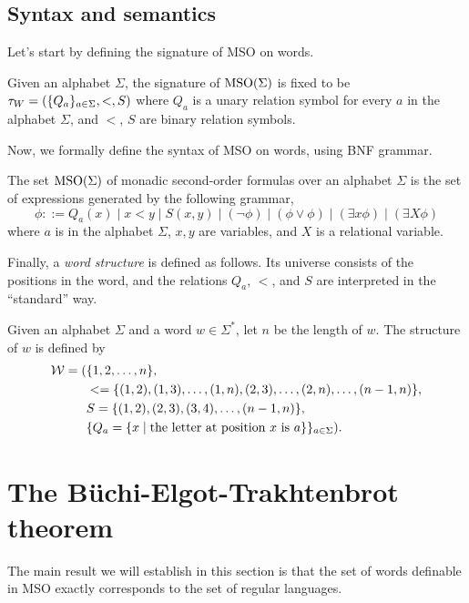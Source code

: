 \documentclass[11pt,twoside=off,numbers=noenddot]{scrbook}
\begin{document}
\subsection{Syntax and semantics}
Let's start by defining the signature of MSO on words.

\begin{definition}
  Given an alphabet $\Sigma$, the signature of $\text{MSO}(\Sigma)$ is fixed to be $\tau_W = (\{ Q_a \}_{a \in \Sigma}, <, S)$ where $Q_a$ is a unary relation symbol for every $a$ in the alphabet $\Sigma$, and $<$, $S$ are binary relation symbols.
\end{definition}

Now, we formally define the syntax of MSO on words, using BNF grammar.

\begin{definition}
  The set $\text{MSO}(\Sigma)$ of monadic second-order formulas over an alphabet $\Sigma$ is the set of expressions generated by the following grammar,
  \[ \phi ::= Q_a(x) \mid x < y \mid S(x, y) \mid (\neg \phi) \mid (\phi \vee \phi) \mid (\exists x \phi) \mid (\exists X \phi) \]
  where $a$ is in the alphabet $\Sigma$, $x, y$ are variables, and $X$ is a relational variable.
\end{definition}

Finally, a \emph{word structure} is defined as follows. Its universe consists of the positions in the word, and the relations $Q_a$, $<$, and $S$ are interpreted in the ``standard'' way.

\begin{definition}
  Given an alphabet $\Sigma$ and a word $w \in \Sigma^\ast$, let $n$ be the length of $w$. The structure of $w$ is defined by
  \begin{align*}
    \mathcal{W} = ( & \{ 1, 2, \dots, n \}, \\
      & < = \{ (1, 2), (1, 3), \dots, (1, n), (2, 3), \dots, (2, n), \dots, (n - 1, n) \}, \\
      & S = \{ (1, 2), (2, 3), (3, 4), \dots, (n - 1, n) \}, \\
    & \{ Q_a = \{ x \mid \text{the letter at position $x$ is $a$} \} \}_{a \in \Sigma}).
  \end{align*}
\end{definition}


\section{The Büchi-Elgot-Trakhtenbrot theorem}
The main result we will establish in this section is that the set of words definable in MSO exactly corresponds to the set of regular languages.
\end{document}
